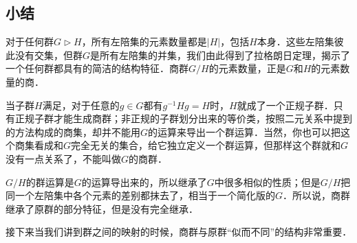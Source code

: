 \subsection{小结}

对于任何群$G\triangleright H$，所有左陪集的元素数量都是$|H|$，包括$H$本身．这些左陪集彼此没有交集，但群$G$是所有左陪集的并集，我们由此得到了拉格朗日定理，揭示了一个任何群都具有的简洁的结构特征．商群$G/H$的元素数量，正是$G$和$H$的元素数量的商．

当子群$H$满足，对于任意的$g\in G$都有$g^{-1}Hg=H$时，$H$就成了一个正规子群．只有正规子群才能生成商群；非正规的子群划分出来的等价类，按照二元关系中提到的方法构成的商集，却并不能用$G$的运算来导出一个群运算．当然，你也可以把这个商集看成和$G$完全无关的集合，给它独立定义一个群运算，但那样这个群就和$G$没有一点关系了，不能叫做$G$的商群．

$G/H$的群运算是$G$的运算导出来的，所以继承了$G$中很多相似的性质；但是$G/H$把同一个左陪集中各个元素的差别都抹去了，相当于一个简化版的$G$．所以说，商群继承了原群的部分特征，但是没有完全继承．

接下来当我们讲到群之间的映射的时候，商群与原群“似而不同”的结构非常重要．




